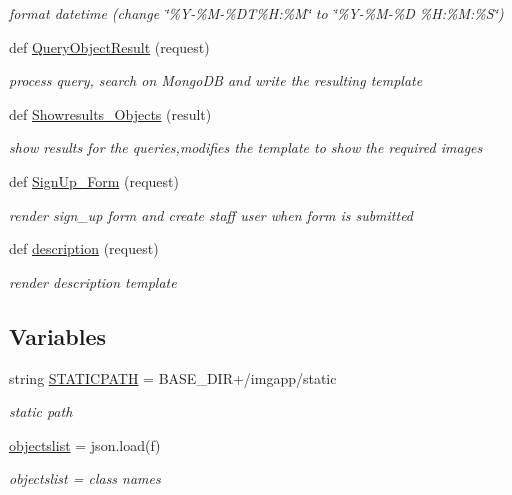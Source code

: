 \begin{DoxyCompactItemize}
\begin{DoxyCompactList}\small\item\em format datetime (change \char`\"{}\%\+Y-\/\%\+M-\/\%\+D\+T\%\+H\+:\%\+M\char`\"{} to \char`\"{}\%\+Y-\/\%\+M-\/\%\+D \%\+H\+:\%\+M\+:\%\+S\char`\"{}) \end{DoxyCompactList}\item 
def \hyperlink{namespaceimgapp_1_1views_a06d5c0cac6ae36a355b522abb883932b}{Query\+Object\+Result} (request)
\begin{DoxyCompactList}\small\item\em process query, search on Mongo\+DB and write the resulting template \end{DoxyCompactList}\item 
def \hyperlink{namespaceimgapp_1_1views_a6ce45040afbe69d047853cb4258a4761}{Showresults\+\_\+\+Objects} (result)
\begin{DoxyCompactList}\small\item\em show results for the queries,modifies the template to show the required images \end{DoxyCompactList}\item 
def \hyperlink{namespaceimgapp_1_1views_a7ff46cd0d8d9cddbd78a488b2e45ce0c}{Sign\+Up\+\_\+\+Form} (request)
\begin{DoxyCompactList}\small\item\em render sign\+\_\+up form and create staff user when form is submitted \end{DoxyCompactList}\item 
def \hyperlink{namespaceimgapp_1_1views_aad5f229f777ab6368cc67dab4436b8ac}{description} (request)
\begin{DoxyCompactList}\small\item\em render description template \end{DoxyCompactList}\end{DoxyCompactItemize}
\subsection*{Variables}
\begin{DoxyCompactItemize}
\item 
string \hyperlink{namespaceimgapp_1_1views_ae3b2640fa382262bdf30df5509438d83}{S\+T\+A\+T\+I\+C\+P\+A\+TH} = B\+A\+S\+E\+\_\+\+D\+IR+\textquotesingle{}/imgapp/static\textquotesingle{}
\begin{DoxyCompactList}\small\item\em static path \end{DoxyCompactList}\item 
\hyperlink{namespaceimgapp_1_1views_ace59bf1ee23e1e68ab25883a1ab83a07}{objectslist} = json.\+load(f)
\begin{DoxyCompactList}\small\item\em objectslist = class names \end{DoxyCompactList}\end{DoxyCompactItemize}


